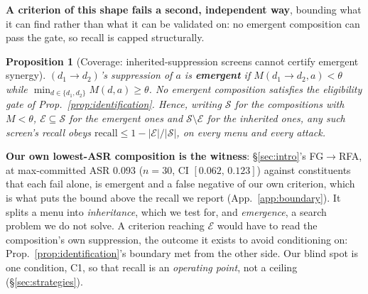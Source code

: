 \documentclass{article}
\newtheorem{proposition}[theorem]{Proposition}
\begin{document}
\noindent \textbf{A criterion of this shape fails a second, independent way}, bounding what it can find rather than what it can be validated on: no emergent composition can pass the gate, so recall is capped structurally.

\begin{proposition}[Coverage: inherited-suppression screens cannot certify emergent synergy]
\label{prop:emergent}
$(d_1 \to d_2)$'s suppression of $a$ is \textbf{emergent} if $M(d_1 \to d_2, a) < \theta$ while $\min_{d \in \{d_1,d_2\}} M(d,a) \ge \theta$. No emergent composition satisfies the eligibility gate of Prop.~\ref{prop:identification}. Hence, writing $\mathcal{S}$ for the compositions with $M < \theta$, $\mathcal{E} \subseteq \mathcal{S}$ for the emergent ones and $\mathcal{S} \setminus \mathcal{E}$ for the inherited ones, any such screen's recall obeys $\mathrm{recall} \le 1 - |\mathcal{E}|/|\mathcal{S}|$, on every menu and every attack.
\end{proposition}

\noindent \textbf{Our own lowest-ASR composition is the witness}: §\ref{sec:intro}'s FG$\to$RFA, at max-committed ASR $0.093$ ($n{=}30$, CI $[0.062,\,0.123]$) against constituents that each fail alone, is emergent and a false negative of our own criterion, which is what puts the bound above the recall we report (App.~\ref{app:boundary}). It splits a menu into \emph{inheritance}, which we test for, and \emph{emergence}, a search problem we do not solve. A criterion reaching $\mathcal{E}$ would have to read the composition's own suppression, the outcome it exists to avoid conditioning on: Prop.~\ref{prop:identification}'s boundary met from the other side. Our blind spot is one condition, C1, so that recall is an \emph{operating point}, not a ceiling (§\ref{sec:strategies}).
\end{document}
